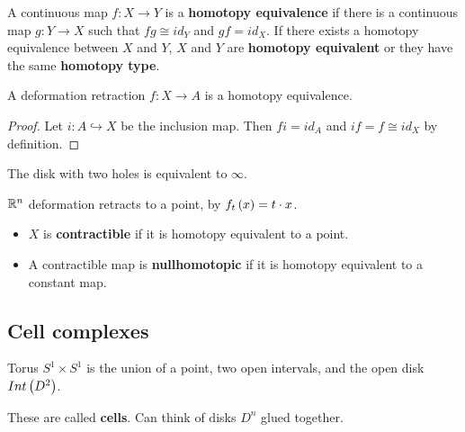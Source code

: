 \begin{definition}
A continuous map $ f : X \to Y $ is a \textbf{homotopy equivalence} if there is a continuous map $ g : Y \to X $ such that $ fg \cong id_Y $ and $ gf = id_X $. If there exists a homotopy equivalence between $ X $ and $ Y $, $ X $ and $ Y $ are \textbf{homotopy equivalent} or they have the same \textbf{homotopy type}.
\end{definition}

\begin{lemma}
A deformation retraction $ f : X \to A $ is a homotopy equivalence.
\end{lemma}

\begin{proof}
Let $ i : A \hookrightarrow X $ be the inclusion map. Then $ fi = id_A $ and $ if = f \cong id_X $ by definition.
\end{proof}

\begin{example1}
The disk with two holes is equivalent to $ \infty $.
\end{example1}

\begin{example1}
$ \mathbb{R}^n $ deformation retracts to a point, by $ f_t\left( x \right) = t \cdot x $.
\end{example1}

\begin{definition}
\hfill
\begin{itemize}
\item $ X $ is \textbf{contractible} if it is homotopy equivalent to a point.
\item A contractible map is \textbf{nullhomotopic} if it is homotopy equivalent to a constant map.
\end{itemize}
\end{definition}

\subsection{Cell complexes}

\begin{example1}
Torus $ S^1 \times S^1 $ is the union of a point, two open intervals, and the open disk $ Int\left( D^2 \right) $.
\end{example1}

These are called \textbf{cells}. Can think of disks $ D^n $ glued together.


